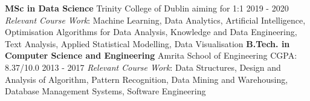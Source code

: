 \begin{cventries}
  \cventry
    {\textbf{MSc in Data Science}}
    {Trinity College of Dublin}
    {aiming for 1:1}
    {2019 - 2020}
    {\textit{Relevant Course Work}: Machine Learning, Data Analytics, Artificial Intelligence, Optimisation Algorithms for Data Analysis, Knowledge and Data Engineering, Text Analysis, Applied Statistical Modelling, Data Visualisation}
  \cventry
    {\textbf{B.Tech. in Computer Science and Engineering}}
    {Amrita School of Engineering}
    {CGPA: 8.37/10.0}
    {2013 - 2017}
    {\textit{Relevant Course Work}: Data Structures, Design and Analysis of Algorithm, Pattern Recognition, Data Mining and Warehousing, Database Management Systems, Software Engineering}
\end{cventries}
